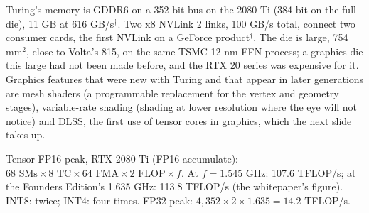 \documentclass[11pt,letterpaper]{article}
\newenvironment{formulas}{\begin{tcolorbox}[formulabox]}{\end{tcolorbox}}
\begin{document}
Turing's memory is GDDR6 on a 352-bit bus on the 2080 Ti (384-bit on the full die), 11 GB at 616 GB/s$^\dagger$. Two x8 NVLink 2 links, 100 GB/s total, connect two consumer cards, the first NVLink on a GeForce product$^\dagger$. The die is large, 754 mm$^2$, close to Volta's 815, on the same TSMC 12 nm FFN process; a graphics die this large had not been made before, and the RTX 20 series was expensive for it. Graphics features that were new with Turing and that appear in later generations are mesh shaders (a programmable replacement for the vertex and geometry stages), variable-rate shading (shading at lower resolution where the eye will not notice) and DLSS, the first use of tensor cores in graphics, which the next slide takes up.

\begin{formulas}
Tensor FP16 peak, RTX 2080 Ti (FP16 accumulate): $68 \text{ SMs} \times 8 \text{ TC} \times 64 \text{ FMA} \times 2 \text{ FLOP} \times f$. At $f = 1.545$ GHz: 107.6 TFLOP/s; at the Founders Edition's 1.635 GHz: 113.8 TFLOP/s (the whitepaper's figure). INT8: twice; INT4: four times. FP32 peak: $4{,}352 \times 2 \times 1.635 = 14.2$ TFLOP/s.
\end{formulas}
\end{document}
